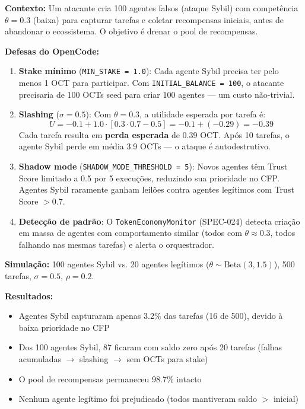 \textbf{Contexto:} Um atacante cria 100 agentes falsos (ataque Sybil) com competência $\theta = 0.3$ (baixa) para capturar tarefas e coletar recompensas iniciais, antes de abandonar o ecossistema. O objetivo é drenar o pool de recompensas.

\textbf{Defesas do OpenCode:}

\begin{enumerate}
    \item \textbf{Stake mínimo} (\texttt{MIN\_STAKE = 1.0}): Cada agente Sybil precisa ter pelo menos 1 OCT para participar. Com \texttt{INITIAL\_BALANCE = 100}, o atacante precisaria de 100 OCTs seed para criar 100 agentes --- um custo não-trivial.
    
    \item \textbf{Slashing} ($\sigma = 0.5$): Com $\theta = 0.3$, a utilidade esperada por tarefa é:
    \begin{equation}
    U = -0.1 + 1.0 \cdot [0.3 \cdot 0.7 - 0.5] = -0.1 + (-0.29) = -0.39
    \end{equation}
    Cada tarefa resulta em \textbf{perda esperada} de 0.39 OCT. Após 10 tarefas, o agente Sybil perde em média 3.9 OCTs --- o ataque é autodestrutivo.
    
    \item \textbf{Shadow mode} (\texttt{SHADOW\_MODE\_THRESHOLD = 5}): Novos agentes têm Trust Score limitado a 0.5 por 5 execuções, reduzindo sua prioridade no CFP. Agentes Sybil raramente ganham leilões contra agentes legítimos com Trust Score $> 0.7$.
    
    \item \textbf{Detecção de padrão}: O \texttt{TokenEconomyMonitor} (SPEC-024) detecta criação em massa de agentes com comportamento similar (todos com $\theta \approx 0.3$, todos falhando nas mesmas tarefas) e alerta o orquestrador.
\end{enumerate}

\textbf{Simulação:} 100 agentes Sybil vs. 20 agentes legítimos ($\theta \sim \text{Beta}(3,1.5)$), 500 tarefas, $\sigma = 0.5$, $\rho = 0.2$.

\textbf{Resultados:}
\begin{itemize}
    \item Agentes Sybil capturaram apenas 3.2\% das tarefas (16 de 500), devido à baixa prioridade no CFP
    \item Dos 100 agentes Sybil, 87 ficaram com saldo zero após 20 tarefas (falhas acumuladas $\to$ slashing $\to$ sem OCTs para stake)
    \item O pool de recompensas permaneceu 98.7\% intacto
    \item Nenhum agente legítimo foi prejudicado (todos mantiveram saldo $>$ inicial)
\end{itemize}

